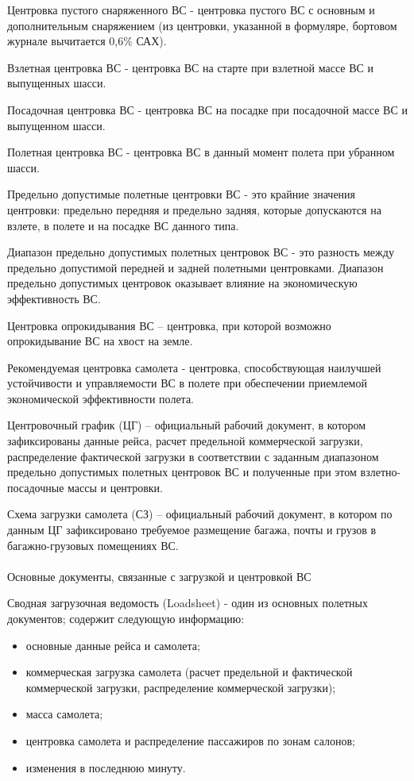 Центровка пустого снаряженного ВС - центровка пустого ВС с основным и дополнительным снаряжением (из центровки, указанной в формуляре, бортовом журнале вычитается 0,6\% САХ).

Взлетная центровка ВС - центровка ВС на старте при взлетной массе ВС и выпущенных шасси.

Посадочная центровка ВС - центровка ВС на посадке при посадочной массе ВС и выпущенном шасси.

Полетная центровка ВС - центровка ВС в данный момент полета при убранном шасси.

Предельно допустимые полетные центровки ВС - это крайние значения центровки: предельно передняя и предельно задняя, которые допускаются на взлете, в полете и на посадке ВС данного типа.

Диапазон предельно допустимых полетных центровок ВС - это разность между предельно допустимой передней и задней полетными центровками. Диапазон предельно допустимых центровок оказывает влияние на экономическую эффективность ВС.

Центровка опрокидывания ВС – центровка, при которой возможно опрокидывание ВС на хвост на земле.

Рекомендуемая центровка самолета - центровка, способствующая наилучшей устойчивости и управляемости ВС в полете при обеспечении приемлемой экономической эффективности полета.

Центровочный график (ЦГ) – официальный рабочий документ, в котором зафиксированы данные рейса, расчет предельной коммерческой загрузки, распределение фактической загрузки в соответствии с заданным диапазоном предельно допустимых полетных центровок ВС и полученные при этом взлетно-посадочные массы и центровки. 

Схема загрузки самолета (СЗ) – официальный рабочий документ, в котором по данным ЦГ зафиксировано требуемое размещение багажа, почты и грузов в багажно-грузовых помещениях ВС.

\paragraph{} Основные документы, связанные с загрузкой и центровкой ВС

Сводная загрузочная ведомость (Loadsheet) - один из основных полетных документов; содержит следующую информацию:
\begin{itemize}
    \item основные данные рейса и самолета;
    \item коммерческая загрузка самолета (расчет предельной и фактической коммерческой загрузки, распределение коммерческой загрузки);
    \item масса самолета;
    \item центровка самолета и распределение пассажиров по зонам салонов;
    \item изменения в последнюю минуту.
\end{itemize}

